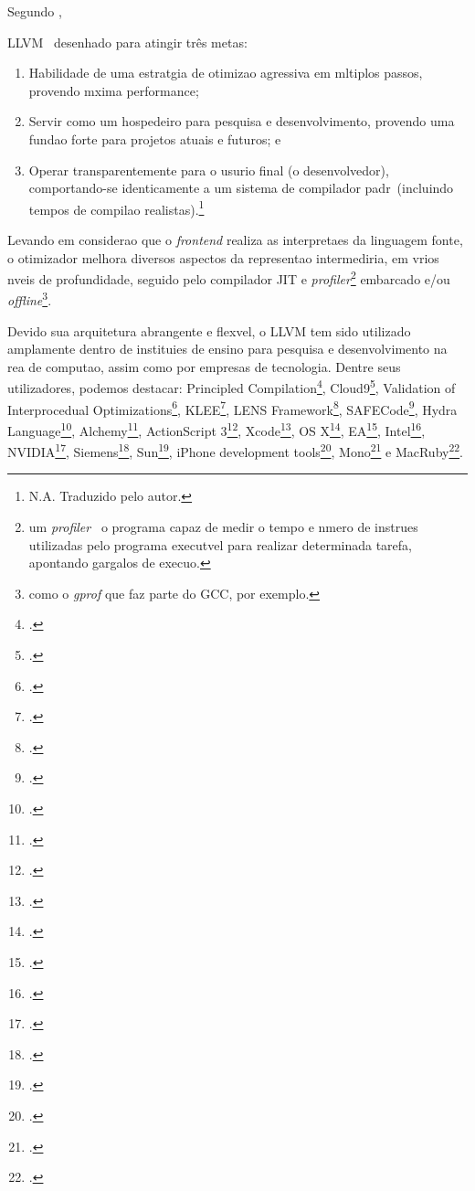 Segundo \cite{Lattner02},
\begin{citacao}
  LLVM \eh\ desenhado para atingir tr\^es metas:
  \begin{enumerate}
    \item Habilidade de uma estrat\eh gia de otimiza\ca o agressiva em m\uh ltiplos passos, provendo m\ah xima performance;
    \item Servir como um hospedeiro para pesquisa e desenvolvimento, provendo uma funda\ca o forte para projetos atuais e futuros; e
    \item Operar transparentemente para o usu\ah rio final (o desenvolvedor), comportando-se identicamente a um sistema de compilador padr\ao\ (incluindo tempos de compila\ca o realistas).\footnote{N.A. Traduzido pelo autor.}
  \end{enumerate}
\end{citacao}
Levando em considera\ca o que o \emph{frontend} realiza as interpreta\co es da linguagem fonte, o otimizador melhora diversos aspectos da representa\ca o intermedi\ah ria, em v\ah rios n\ih veis de profundidade, seguido pelo compilador JIT e \emph{profiler}\footnote{um \emph{profiler} \eh\ o programa capaz de medir o tempo e n\uh mero de instru\co es utilizadas pelo programa execut\ah vel para realizar determinada tarefa, apontando gargalos de execu\ca o.} embarcado e/ou \emph{offline}\footnote{como o \emph{gprof} que faz parte do GCC, por exemplo.}.


Devido sua arquitetura abrangente e flex\ih vel, o LLVM tem sido utilizado amplamente dentro de institui\co es de ensino para pesquisa e desenvolvimento na \ah rea de computa\ca o, assim como por empresas de tecnologia. Dentre seus utilizadores, podemos destacar: Principled Compilation\footnote{\cite{Carnegie}.}, Cloud9\footnote{\cite{Ecole}.}, Validation of Interprocedual Optimizations\footnote{\cite{NewYork}.}, KLEE\footnote{\cite{Stanford}.}, LENS Framework\footnote{\cite{California}.}, SAFECode\footnote{\cite{Illinois}.}, Hydra Language\footnote{\cite{Adobe1}.}, Alchemy\footnote{\cite{Adobe2}.}, ActionScript 3\footnote{\cite{Adobe3}.}, Xcode\footnote{\cite{Apple1}.}, OS X\footnote{\cite{Apple2}.}, EA\footnote{\cite{EA}.}, Intel\footnote{\cite{Intel}.}, NVIDIA\footnote{\cite{NVIDIA}.}, Siemens\footnote{\cite{Siemens}.}, Sun\footnote{\cite{Sun}.}, iPhone development tools\footnote{\cite{iPhoneDev}.}, Mono\footnote{\cite{Mono}.} e MacRuby\footnote{\cite{MacRuby}.}.

